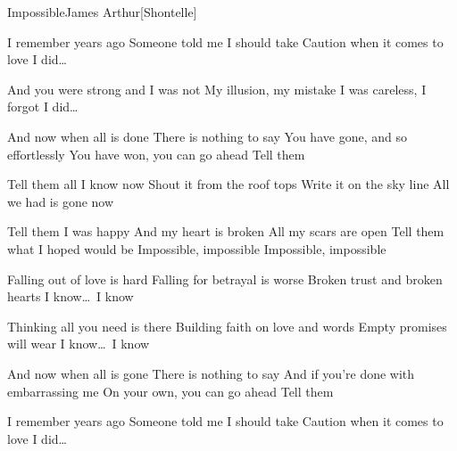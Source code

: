 \documentclass[a4paper,11pt,french]{article}
\begin{document}

\begin{Song}{Impossible}{James Arthur}[Shontelle]
\begin{multicols}{2}
\begin{Verse}
I remember years ago
Someone told me I should take
Caution when it comes to love
I did\dots\
\espaceInterStrophe

And you were strong and I was not
My illusion, my mistake
I was careless, I forgot
I did\dots\
\end{Verse}
\espaceInterStrophe

\begin{PreChorus}
And now when all is done
There is nothing to say
You have gone, and so effortlessly
You have won, you can go ahead 
Tell them
\end{PreChorus}
\espaceInterStrophe

\begin{Chorus}
Tell them all I know now
Shout it from the roof tops
Write it on the sky line
All we had is gone now
\espaceInterStrophe

Tell them I was happy
And my heart is broken
All my scars are open
Tell them what I hoped would be
Impossible, impossible
Impossible, impossible
\end{Chorus}
\columnbreak

\begin{Verse}
Falling out of love is hard
Falling for betrayal is worse
Broken trust and broken hearts
I know\dots\ I know
\espaceInterStrophe

Thinking all you need is there
Building faith on love and words
Empty promises will wear
I know\dots\ I know
\end{Verse}
\espaceInterStrophe

\begin{PreChorus}
And now when all is gone
There is nothing to say
And if you're done with embarrassing me
On your own, you can go ahead 
Tell them
\end{PreChorus}
\espaceInterStrophe

\tochorus
\espaceInterStrophe

\begin{Verse}
I remember years ago
Someone told me I should take
Caution when it comes to love
I did\dots
\end{Verse}
\espaceInterStrophe

\tochorus
\vfill
~
\end{multicols}


\end{Song}
\end{document}
